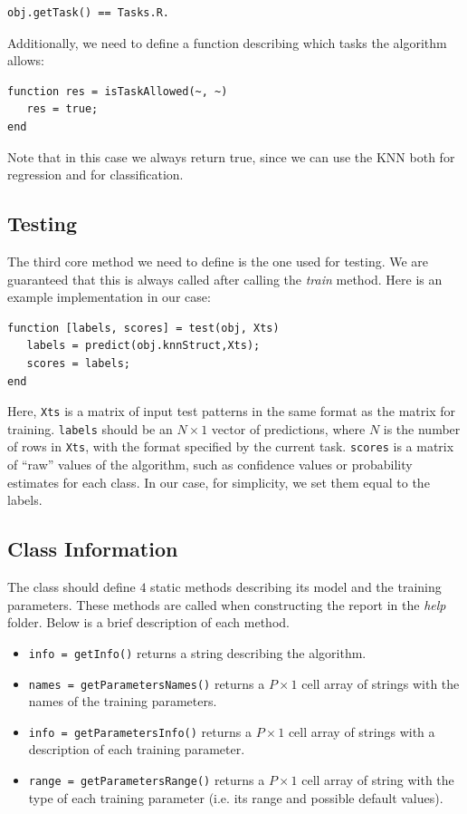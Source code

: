 \begin{lstlisting}
obj.getTask() == Tasks.R.
\end{lstlisting}

Additionally, we need to define a function describing which tasks the algorithm allows:

\begin{lstlisting}
function res = isTaskAllowed(~, ~)
   res = true;
end
\end{lstlisting}

Note that in this case we always return true, since we can use the KNN both for regression and for classification.

\subsection{Testing}

The third core method we need to define is the one used for testing. We are guaranteed that this is always called after calling the \textit{train} method. Here is an example implementation in our case:

\begin{lstlisting}
function [labels, scores] = test(obj, Xts)
   labels = predict(obj.knnStruct,Xts);
   scores = labels;
end
\end{lstlisting}

Here, \verb|Xts| is a matrix of input test patterns in the same format as the matrix for training. \verb|labels| should be an $N\times1$ vector of predictions, where $N$ is the number of rows in \verb|Xts|, with the format specified by the current task. \verb|scores| is a matrix of ``raw'' values of the algorithm, such as confidence values or probability estimates for each class. In our case, for simplicity, we set them equal to the labels.

\subsection{Class Information}

The class should define $4$ static methods describing its model and the training parameters. These methods are called when constructing the report in the \textit{help} folder. Below is a brief description of each method.

\begin{itemize}
	\item \verb|info = getInfo()| returns a string describing the algorithm.
	\item \verb|names = getParametersNames()| returns a $P\times1$ cell array of strings with the names of the training parameters.
	\item \verb|info = getParametersInfo()| returns a $P\times1$ cell array of strings with a description of each training parameter.
	\item \verb|range = getParametersRange()| returns a $P\times1$ cell array of string with the type of each training parameter (i.e. its range and possible default values).
\end{itemize}

